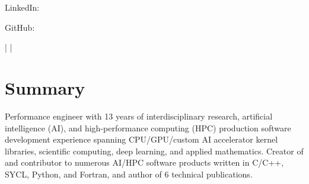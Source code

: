 \documentclass[letterpaper,10pt]{article}
\begin{document}
\href{\AuthorWebsiteLink}{\scshape\huge\Author}\vspace{2pt}

\begin{small}
  LinkedIn: \href{\AuthorLinkedInLink}{\AuthorLinkedInText}

  \vspace{2pt}
  GitHub: \href{\AuthorGitHubLink}{\AuthorGitHubText}

  \vspace{1pt}
  \AuthorAddress{} |
  \href{mailto:\AuthorEmail}{\AuthorEmail} |
  \href{\AuthorPhoneLink}{\AuthorPhoneText}
\end{small}

\section{Summary}
Performance engineer with 13 years of interdisciplinary research,
artificial intelligence (AI), and high-performance computing (HPC) production
software development experience spanning CPU/GPU/custom AI accelerator kernel
libraries, scientific computing, deep learning, and applied mathematics.
Creator of and contributor to numerous AI/HPC software products written in
C/C++, SYCL, Python, and Fortran, and author of 6 technical publications.

\vspace{-182.5pt}
\end{document}
